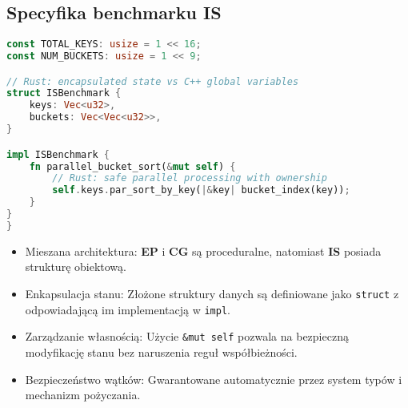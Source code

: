 \subsection{Specyfika benchmarku IS}
\begin{lstlisting}[language=Rust, caption={Implementacja benchmarku IS w języku Rust}, label={lst:is_rust}]
const TOTAL_KEYS: usize = 1 << 16;
const NUM_BUCKETS: usize = 1 << 9;

// Rust: encapsulated state vs C++ global variables
struct ISBenchmark {
    keys: Vec<u32>,
    buckets: Vec<Vec<u32>>,
}

impl ISBenchmark {
    fn parallel_bucket_sort(&mut self) {
        // Rust: safe parallel processing with ownership
        self.keys.par_sort_by_key(|&key| bucket_index(key));
    }
}
}
\end{lstlisting}
\begin{itemize}
    \item Mieszana architektura: \textbf{EP} i \textbf{CG} są proceduralne, natomiast \textbf{IS} posiada strukturę obiektową.
    \item Enkapsulacja stanu: Złożone struktury danych są definiowane jako \texttt{struct} z odpowiadającą im implementacją w \texttt{impl}.
    \item Zarządzanie własnością: Użycie \texttt{\&mut self} pozwala na bezpieczną modyfikację stanu bez naruszenia reguł współbieżności.
    \item Bezpieczeństwo wątków: Gwarantowane automatycznie przez system typów i mechanizm pożyczania.
\end{itemize}

  